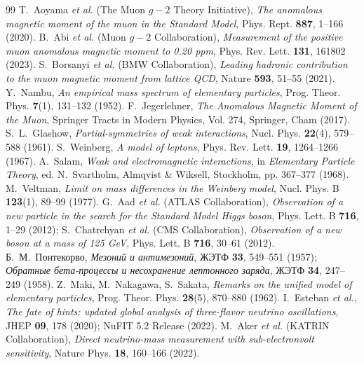 \documentclass[11pt,a4paper]{article}
\theoremstyle{definition}
\theoremstyle{remark}
\begin{document}
\begin{thebibliography}{99}
T.~Aoyama \textit{et al.} (The Muon $g-2$ Theory Initiative), \textit{The anomalous magnetic moment of the muon in the Standard Model}, Phys. Rept. \textbf{887}, 1--166 (2020).
B.~Abi \textit{et al.} (Muon $g-2$ Collaboration), \textit{Measurement of the positive muon anomalous magnetic moment to 0.20 ppm}, Phys. Rev. Lett. \textbf{131}, 161802 (2023).
S.~Borsanyi \textit{et al.} (BMW Collaboration), \textit{Leading hadronic contribution to the muon magnetic moment from lattice QCD}, Nature \textbf{593}, 51--55 (2021).
Y.~Nambu, \textit{An empirical mass spectrum of elementary particles}, Prog. Theor. Phys. \textbf{7}(1), 131--132 (1952).
F.~Jegerlehner, \textit{The Anomalous Magnetic Moment of the Muon}, Springer Tracts in Modern Physics, Vol. 274, Springer, Cham (2017).
S.~L.~Glashow, \textit{Partial-symmetries of weak interactions}, Nucl. Phys. \textbf{22}(4), 579--588 (1961).
S.~Weinberg, \textit{A model of leptons}, Phys. Rev. Lett. \textbf{19}, 1264--1266 (1967).
A.~Salam, \textit{Weak and electromagnetic interactions}, in \textit{Elementary Particle Theory}, ed. N.~Svartholm, Almqvist \& Wiksell, Stockholm, pp. 367--377 (1968).
M.~Veltman, \textit{Limit on mass differences in the Weinberg model}, Nucl. Phys. B \textbf{123}(1), 89--99 (1977).
G.~Aad \textit{et al.} (ATLAS Collaboration), \textit{Observation of a new particle in the search for the Standard Model Higgs boson}, Phys. Lett. B \textbf{716}, 1--29 (2012); S.~Chatrchyan \textit{et al.} (CMS Collaboration), \textit{Observation of a new boson at a mass of 125 GeV}, Phys. Lett. B \textbf{716}, 30--61 (2012).
Б.~М.~Понтекорво, \textit{Мезоний и антимезоний}, ЖЭТФ \textbf{33}, 549--551 (1957); \textit{Обратные бета-процессы и несохранение лептонного заряда}, ЖЭТФ \textbf{34}, 247--249 (1958).
Z.~Maki, M.~Nakagawa, S.~Sakata, \textit{Remarks on the unified model of elementary particles}, Prog. Theor. Phys. \textbf{28}(5), 870--880 (1962).
I.~Esteban \textit{et al.}, \textit{The fate of hints: updated global analysis of three-flavor neutrino oscillations}, JHEP \textbf{09}, 178 (2020); NuFIT 5.2 Release (2022).
M.~Aker \textit{et al.} (KATRIN Collaboration), \textit{Direct neutrino-mass measurement with sub-electronvolt sensitivity}, Nature Phys. \textbf{18}, 160--166 (2022).

\end{thebibliography}
\end{document}
